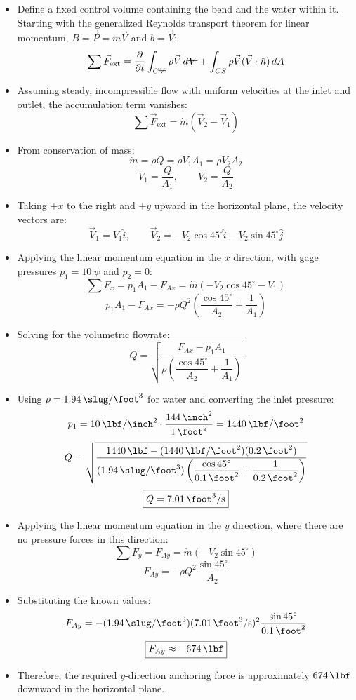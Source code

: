 ﻿\documentclass[12pt]{article}
\newcommand{\vol}{\mathord{\text{\ooalign{\hidewidth $V$\hidewidth\cr\kern-0.5pt\raisebox{0.8ex}{\rule[0pt]{1em}{0.5pt}}}}}}
\begin{document}
\begin{itemize}
    \item Define a fixed control volume containing the bend and the water within it. Starting with the generalized Reynolds transport theorem for linear momentum, $B=\vec{P}=m\vec{V}$ and $b=\vec{V}$:
    \[\sum\vec{F}_{\mathrm{ext}}=\frac{\partial}{\partial t}\int_{C\vol}\rho\vec{V}\,d\vol+\int_{CS}\rho\vec{V}(\vec{V}\cdot\hat{n})\,dA\]
    \item Assuming steady, incompressible flow with uniform velocities at the inlet and outlet, the accumulation term vanishes:
    \[\sum\vec{F}_{\mathrm{ext}}=\dot{m}(\vec{V}_2-\vec{V}_1)\]
    \item From conservation of mass:
    \[\dot{m}=\rho Q=\rho V_1A_1=\rho V_2A_2\]
    \[V_1=\frac{Q}{A_1},\qquad V_2=\frac{Q}{A_2}\]
    \item Taking $+x$ to the right and $+y$ upward in the horizontal plane, the velocity vectors are:
    \[\vec{V}_1=V_1\hat{i},\qquad \vec{V}_2=-V_2\cos45^\circ\hat{i}-V_2\sin45^\circ\hat{j}\]
    \item Applying the linear momentum equation in the $x$ direction, with gage pressures $p_1=\SI{10}{\psi}$ and $p_2=0$:
    \[\sum F_x=p_1A_1-F_{Ax}=\dot{m}(-V_2\cos45^\circ-V_1)\]
    \[p_1A_1-F_{Ax}=-\rho Q^2\left(\frac{\cos45^\circ}{A_2}+\frac{1}{A_1}\right)\]
    \item Solving for the volumetric flowrate:
    \[Q=\sqrt{\frac{F_{Ax}-p_1A_1}{\rho\left(\dfrac{\cos45^\circ}{A_2}+\dfrac{1}{A_1}\right)}}\]
    \item Using $\rho=\SI{1.94}{\slug\per\foot\cubed}$ for water and converting the inlet pressure:
    \[p_1=\SI{10}{\lbf\per\inch\squared}\cdot\frac{\SI{144}{\inch\squared}}{\SI{1}{\foot\squared}}=\SI{1440}{\lbf\per\foot\squared}\]
    \[Q=\sqrt{\frac{\SI{1440}{\lbf}-(\SI{1440}{\lbf\per\foot\squared})(\SI{0.2}{\foot\squared})}{(\SI{1.94}{\slug\per\foot\cubed})\left(\dfrac{\cos45^\circ}{\SI{0.1}{\foot\squared}}+\dfrac{1}{\SI{0.2}{\foot\squared}}\right)}}\]
    \[\boxed{Q=\SI{7.01}{\foot\cubed\per\second}}\]
    \item Applying the linear momentum equation in the $y$ direction, where there are no pressure forces in this direction:
    \[\sum F_y=F_{Ay}=\dot{m}(-V_2\sin45^\circ)\]
    \[F_{Ay}=-\rho Q^2\frac{\sin45^\circ}{A_2}\]
    \item Substituting the known values:
    \[F_{Ay}=-(\SI{1.94}{\slug\per\foot\cubed})(\SI{7.01}{\foot\cubed\per\second})^2\frac{\sin45^\circ}{\SI{0.1}{\foot\squared}}\]
    \[\boxed{F_{Ay}\approx-\SI{674}{\lbf}}\]
    \item Therefore, the required $y$-direction anchoring force is approximately $\SI{674}{\lbf}$ downward in the horizontal plane.
\end{itemize}
\end{document}
